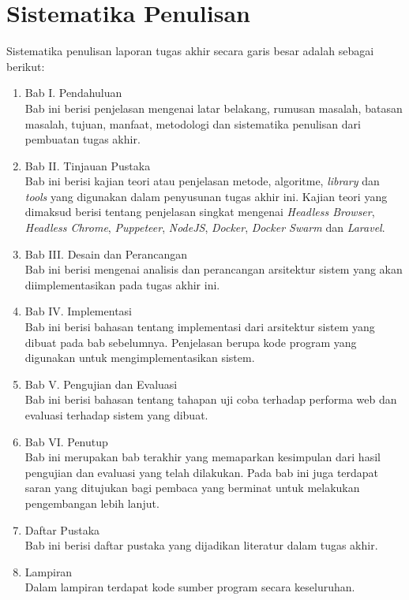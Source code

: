 	\section{Sistematika Penulisan}
		Sistematika penulisan laporan tugas akhir secara garis besar adalah sebagai berikut:
		\begin{enumerate}
			\item Bab I. Pendahuluan\\
				Bab ini berisi penjelasan mengenai latar belakang, rumusan masalah, batasan masalah, tujuan, manfaat, metodologi dan sistematika penulisan dari pembuatan tugas akhir.
			\item Bab II. Tinjauan Pustaka\\
				Bab ini berisi kajian teori atau penjelasan metode, algoritme, \textit{library} dan \textit{tools} yang digunakan dalam penyusunan tugas akhir ini. Kajian teori yang dimaksud berisi tentang penjelasan singkat mengenai \textit{Headless Browser}, \textit{Headless Chrome}, \textit{Puppeteer}, \textit{NodeJS}, \textit{Docker}, \textit{Docker Swarm} dan \textit{Laravel}.
			\item Bab III. Desain dan Perancangan\\
				Bab ini berisi mengenai analisis dan perancangan arsitektur sistem yang akan diimplementasikan pada tugas akhir ini.
			\item Bab IV. Implementasi\\
				Bab ini berisi bahasan tentang implementasi dari arsitektur sistem yang dibuat pada bab sebelumnya. Penjelasan berupa kode program yang digunakan untuk mengimplementasikan sistem.
			\item Bab V. Pengujian dan Evaluasi\\
				Bab ini berisi bahasan tentang tahapan uji coba terhadap performa web dan evaluasi terhadap sistem yang dibuat.
			\item Bab VI. Penutup\\
				Bab ini merupakan bab terakhir yang memaparkan kesimpulan dari hasil pengujian dan evaluasi yang telah dilakukan. Pada bab ini juga terdapat saran yang ditujukan bagi pembaca yang berminat untuk melakukan pengembangan lebih lanjut.
			\item Daftar Pustaka\\
				Bab ini berisi daftar pustaka yang dijadikan literatur dalam tugas akhir.
			\item Lampiran\\
				Dalam lampiran terdapat kode sumber program secara keseluruhan.
		\end{enumerate}